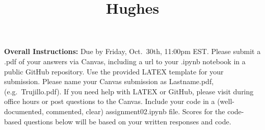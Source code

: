 \documentclass[11pt]{article}
\title{Hughes}
\begin{document}
    
    \maketitle
    
    



\textbf{Overall Instructions:} Due by Friday, Oct.~30th, 11:00pm EST.
Please submit a .pdf of your answers via Canvas, including a url to your
.ipynb notebook in a public GitHub repository. Use the provided LATEX
template for your submission. Please name your Canvas submission as
Lastname.pdf, (e.g.~Trujillo.pdf). If you need help with LATEX or
GitHub, please visit during office hours or post questions to the
Canvas. Include your code in a (well-documented, commented, clear)
assignment02.ipynb file. Scores for the code-based questions below will
be based on your written responses and code.
\end{document}
